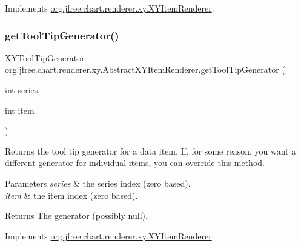 Implements \mbox{\hyperlink{interfaceorg_1_1jfree_1_1chart_1_1renderer_1_1xy_1_1_x_y_item_renderer_abd9e042bb8bfa4f20a45346e850710b8}{org.\+jfree.\+chart.\+renderer.\+xy.\+X\+Y\+Item\+Renderer}}.

\mbox{\label{classorg_1_1jfree_1_1chart_1_1renderer_1_1xy_1_1_abstract_x_y_item_renderer_a311620b0daf12b3b8eec598b4d99e93d}} 
\subsubsection{\texorpdfstring{get\+Tool\+Tip\+Generator()}{getToolTipGenerator()}\hspace{0.1cm}{\footnotesize\ttfamily [1/2]}}
{\footnotesize\ttfamily \mbox{\hyperlink{interfaceorg_1_1jfree_1_1chart_1_1labels_1_1_x_y_tool_tip_generator}{X\+Y\+Tool\+Tip\+Generator}} org.\+jfree.\+chart.\+renderer.\+xy.\+Abstract\+X\+Y\+Item\+Renderer.\+get\+Tool\+Tip\+Generator (\begin{DoxyParamCaption}\item[{int}]{series,  }\item[{int}]{item }\end{DoxyParamCaption})}

Returns the tool tip generator for a data item. If, for some reason, you want a different generator for individual items, you can override this method.


\begin{DoxyParams}{Parameters}
{\em series} & the series index (zero based). \\
\hline
{\em item} & the item index (zero based).\\
\hline
\end{DoxyParams}
\begin{DoxyReturn}{Returns}
The generator (possibly {\ttfamily null}). 
\end{DoxyReturn}


Implements \mbox{\hyperlink{interfaceorg_1_1jfree_1_1chart_1_1renderer_1_1xy_1_1_x_y_item_renderer_a90ed45f2e76d920007c655208d980dc0}{org.\+jfree.\+chart.\+renderer.\+xy.\+X\+Y\+Item\+Renderer}}.

